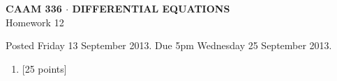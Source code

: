 \documentclass[10pt]{article}
\begin{document}
\vspace*{-5em}
\begin{center}
\large \textsf{\textbf{CAAM 336 $\cdot$ DIFFERENTIAL EQUATIONS}\\[0.5em]
Homework 12 }
\end{center}

Posted Friday 13 September 2013. Due 5pm Wednesday 25 September 2013.

\begin{enumerate}\addtocounter{enumi}{11}
\item {[25 points]}\\  

\end{enumerate}
\end{document}
